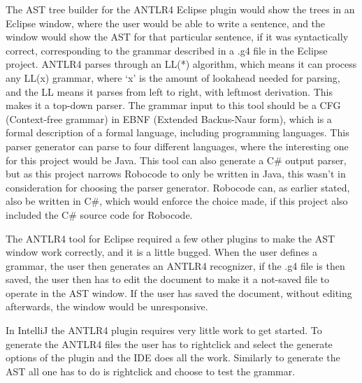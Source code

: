 The AST tree builder for the ANTLR4 Eclipse plugin would show the trees in an Eclipse window, where the user would be able to write a sentence, and the window would show the AST for that particular sentence, if it was syntactically correct, corresponding to the grammar described in a .g4 file in the Eclipse project.
ANTLR4 parses through an LL(*) algorithm, which means it can process any LL(x) grammar, where ‘x’ is the amount of lookahead needed for parsing, and the LL means it parses from left to right, with leftmost derivation. This makes it a top-down parser. The grammar input to this tool should be a CFG (Context-free grammar) in EBNF (Extended Backus-Naur form), which is a formal description of a formal language, including programming languages. This parser generator can parse to four different languages, where the interesting one for this project would be Java. This tool can also generate a C\# output parser, but as this project narrows Robocode to only be written in Java, this wasn’t in consideration for choosing the parser generator. Robocode can, as earlier stated, also be written in C\#, which would enforce the choice made, if this project also included the C\# source code for Robocode.

The ANTLR4 tool for Eclipse required a few other plugins to make the AST window work correctly, and it is a little bugged. When the user defines a grammar, the user then generates an ANTLR4 recognizer, if the .g4 file is then saved, the user then has to edit the document to make it a not-saved file to operate in the AST window. If the user has saved the document, without editing afterwards, the window would be unresponsive.

In IntelliJ the ANTLR4 plugin requires very little work to get started. To generate the ANTLR4 files the user has to rightclick and select the generate options of the plugin and the IDE does all the work. Similarly to generate the AST all one has to do is rightclick and choose to test the grammar.
